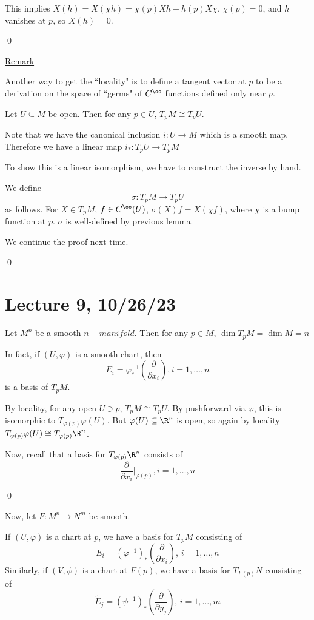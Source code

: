 \documentclass[x11names,reqno,14pt]{extarticle}
\newcommand{\pp}[2]{\dfrac{\partial #1}{\partial #2}}
\renewcommand{\phi}{\varphi}
\begin{document}
This implies $X(h) = X(\chi h) = \chi(p)Xh + h(p)X\chi$. $\chi(p) = 0$, and $h$ vanishes at $p$, so $X(h) = 0$. 

\qed

\underline{Remark}

Another way to get the ``locality" is to define a tangent vector at $p$ to be a derivation on the space of ``germs" of $C^\oo$ functions defined only near $p$. 

\cor[Locality]

Let $U \subseteq M$ be open. Then for any $p \in U$, $T_pM \cong T_pU$.

\proof

Note that we have the canonical inclusion $i:U\to M$ which is a smooth map. Therefore we have a linear map $i_*:T_pU\to T_pM$

To show this is a linear isomorphism, we have to construct the inverse by hand. 

We define
\[
\sigma:T_pM\to T_pU
\]
as follows. For $X \in T_pM$, $f\in C^\oo(U)$, $\sigma(X)f = X(\chi f)$, where $\chi$ is a bump function at $p$. $\sigma$ is well-defined by previous lemma. 



We continue the proof next time.



\qed


\section*{Lecture 9, 10/26/23}

\prop

Let $M^n$ be a smooth $n-manifold$. Then for any $p \in M$, $\dim T_pM = \dim M = n$

In fact, if $(U, \phi)$ is a smooth chart, then
\[
E_i = \phi_*^{-1}\left(\pp{}{x_i}\right), i = 1, \dots, n
\]
is a basis of $T_pM$.

\proof

By locality, for any open $U \ni p$, $T_pM \cong T_pU$. By pushforward via $\phi$, this is isomorphic to $T_{\phi(p)}\phi(U)$. But $\phi(U) \subseteq \R^n$ is open, so again by locality $T_{\phi(p)}\phi(U) \cong T_{\phi(p)}\R^n$. 

Now, recall that a basis for $T_{\phi(p)}\R^n$ consists of
\[
\pp{}{x_i}|_{\phi(p)}, i = 1, \dots, n
\]

\qed

Now, let $F:M^n\to N^m$ be smooth. 

If $(U, \phi)$ is a chart at $p$, we have a basis for $T_pM$ consisting of 
\[
E_i = (\phi^{-1})_*\left(\pp{}{x_i}\right), \,i = 1, \dots, n
\]
Similarly, if $(V, \psi)$ is a chart at $F(p)$, we have a basis for $T_{F(p)}N$ consisting of
\[
\tilde{E}_j = (\psi^{-1})_*\left(\pp{}{y_j}\right), \,i = 1, \dots, m
\]
\end{document}
